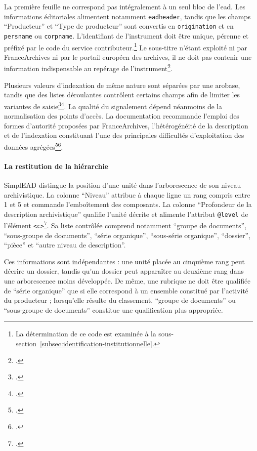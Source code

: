 La première feuille ne correspond pas intégralement à un seul bloc de l'\gls{ead}. Les informations éditoriales alimentent notamment \texttt{eadheader}, tandis que les champs \enquote{Producteur} et \enquote{Type de producteur} sont convertis en \texttt{origination} et en \texttt{persname} ou \texttt{corpname}. L'identifiant de l'instrument doit être unique, pérenne et préfixé par le code du service contributeur.\footnote{La détermination de ce code est examinée à la sous-section~\ref{subsec:identification-institutionnelle}.} Le sous-titre n'étant exploité ni par FranceArchives ni par le portail européen des archives, il ne doit pas contenir une information indispensable au repérage de l'instrument\footcite{FranceArchivesSimplEADDocumentation}.

Plusieurs valeurs d'indexation de même nature sont séparées par une arobase, tandis que des listes déroulantes contrôlent certains champs afin de limiter les variantes de saisie\footcite{FranceArchivesSimplEAD}\footcite{FranceArchivesSimplEADDocumentation}. La qualité du \gls{signalement} dépend néanmoins de la normalisation des points d'accès. La documentation recommande l'emploi des formes d'autorité proposées par FranceArchives, l'hétérogénéité de la description et de l'indexation constituant l'une des principales difficultés d'exploitation des données agrégées\footcite{FranceArchivesSimplEADDocumentation}\footcite[p.~40]{Restif2021}.

\paragraph{La restitution de la hiérarchie}

SimplEAD distingue la position d'une unité dans l'arborescence de son niveau archivistique. La colonne \enquote{Niveau} attribue à chaque ligne un rang compris entre 1 et 5 et commande l'emboîtement des composants. La colonne \enquote{Profondeur de la description archivistique} qualifie l'unité décrite et alimente l'attribut \texttt{@level} de l'élément \texttt{<c>}\footcite{FranceArchivesSimplEADDocumentation}. Sa liste contrôlée comprend notamment \enquote{groupe de documents}, \enquote{sous-groupe de documents}, \enquote{série organique}, \enquote{sous-série organique}, \enquote{dossier}, \enquote{pièce} et \enquote{autre niveau de description}.

Ces informations sont indépendantes : une unité placée au cinquième rang peut décrire un dossier, tandis qu'un dossier peut apparaître au deuxième rang dans une arborescence moins développée. De même, une rubrique ne doit être qualifiée de \enquote{série organique} que si elle correspond à un ensemble constitué par l'activité du producteur ; lorsqu'elle résulte du classement, \enquote{groupe de documents} ou \enquote{sous-groupe de documents} constitue une qualification plus appropriée.

